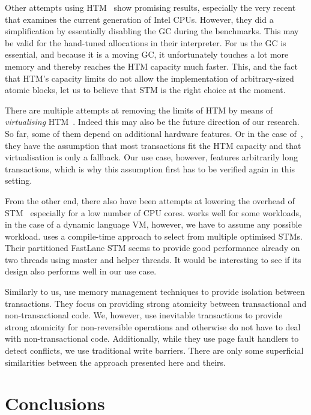 \documentclass{sigplanconf}
\begin{document}
Other attempts using HTM~\cite{nicholas06,odaira14,fuad10} show
promising results, especially the very recent~\cite{odaira14} that
examines the current generation of Intel CPUs. However, they did a
simplification by essentially disabling the GC during the
benchmarks. This may be valid for the hand-tuned allocations in their
interpreter. For us the GC is essential, and because it is a moving
GC, it unfortunately touches a lot more memory and thereby reaches the
HTM capacity much faster.  This, and the fact that HTM's capacity
limits do not allow the implementation of arbitrary-sized atomic blocks, let
us to believe that STM is the right choice at the moment.

There are multiple attempts at removing the limits of HTM by means of
\emph{virtualising} HTM~\cite{rajwar05,chung06}. Indeed this may also
be the future direction of our research. So far, some of them depend
on additional hardware features. Or in the case of~\cite{chung06},
they have the assumption that most transactions fit the HTM capacity
and that virtualisation is only a fallback. Our use case, however,
features arbitrarily long transactions, which is why this assumption
first has to be verified again in this setting.

From the other end, there also have been attempts at lowering the
overhead of STM~\cite{warmhoff13,spear09} especially for a low number
of CPU cores. \cite{spear09} works well for some workloads, in the
case of a dynamic language VM, however, we have to assume any possible
workload.  \cite{warmhoff13} uses a compile-time approach to select
from multiple optimised STMs. Their partitioned FastLane STM seems to
provide good performance already on two threads using master and
helper threads. It would be interesting to see if its design also
performs well in our use case.

Similarly to us, \cite{martin09} use memory management techniques to
provide isolation between transactions. They focus on providing strong
atomicity between transactional and non-transactional code.  We,
however, use inevitable transactions to provide strong atomicity
for non-reversible operations and otherwise do not have to deal
with non-transactional code.  Additionally, while they use page fault
handlers to detect conflicts, we use traditional write barriers. There
are only some superficial similarities between the approach presented
here and theirs.




\section{Conclusions}
\end{document}
